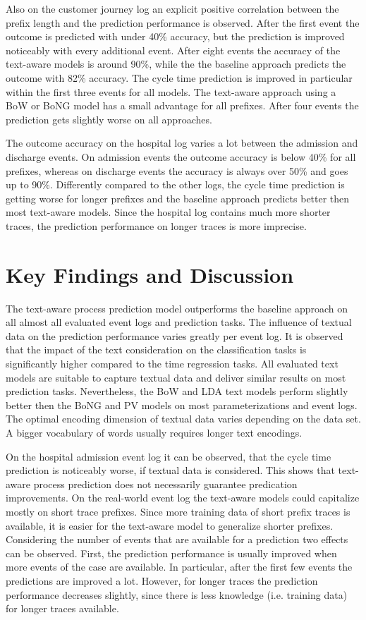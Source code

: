 Also on the customer journey log an explicit positive correlation between the prefix length and the prediction performance is observed.
After the first event the outcome is predicted with under 40\% accuracy, but the prediction is improved noticeably with every additional event.
After eight events the accuracy of the text-aware models is around 90\%, while the the baseline approach predicts the outcome with 82\% accuracy.
The cycle time prediction is improved in particular within the first three events for all models.
The text-aware approach using a BoW or BoNG model has a small advantage for all prefixes.
After four events the prediction gets slightly worse on all approaches.

The outcome accuracy on the hospital log varies a lot between the admission and discharge events.
On admission events the outcome accuracy is below 40\% for all prefixes, whereas on discharge events the accuracy is always over 50\% and goes up to 90\%.
Differently compared to the other logs, the cycle time prediction is getting worse for longer prefixes and the baseline approach predicts better then most text-aware models.
Since the hospital log contains much more shorter traces, the prediction performance on longer traces is more imprecise.
 

\section{Key Findings and Discussion}

The text-aware process prediction model outperforms the baseline approach on all almost all evaluated event logs and prediction tasks.
The influence of textual data on the prediction performance varies greatly per event log.
It is observed that the impact of the text consideration on the classification tasks is significantly higher compared to the time regression tasks.
All evaluated text models are suitable to capture textual data and deliver similar results on most prediction tasks.
Nevertheless, the BoW and LDA text models perform slightly better then the BoNG and PV models on most parameterizations and event logs.
The optimal encoding dimension of textual data varies depending on the data set.
A bigger vocabulary of words usually requires longer text encodings.

On the hospital admission event log it can be observed, that the cycle time prediction is noticeably worse, if textual data is considered.
This shows that text-aware process prediction does not necessarily guarantee predication improvements.
On the real-world event log the text-aware models could capitalize mostly on short trace prefixes.
Since more training data of short prefix traces is available, it is easier for the text-aware model to generalize shorter prefixes.
Considering the number of events that are available for a prediction two effects can be observed.
First, the prediction performance is usually improved when more events of the case are available.
In particular, after the first few events the predictions are improved a lot.
However, for longer traces the prediction performance decreases slightly, since there is less knowledge (i.e. training data) for longer traces available.

